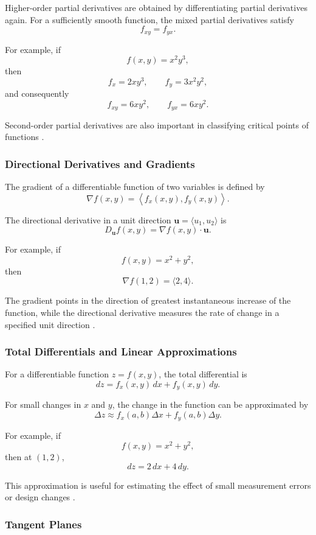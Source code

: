 \documentclass[a4paper,12pt]{article}
\theoremstyle{mystyle}
\numberwithin{equation}{section}
\numberwithin{theorem}{section}
\numberwithin{proposition}{section}
\numberwithin{example}{section}
\numberwithin{remark}{section}
\numberwithin{lemma}{section}
\numberwithin{corollary}{section}
\numberwithin{definition}{section}
\begin{document}
Higher-order partial derivatives are obtained by
differentiating partial derivatives again. For a
sufficiently smooth function, the mixed partial
derivatives satisfy
\[
f_{xy}=f_{yx}.
\]

For example, if
\[
f(x,y)=x^2y^3,
\]
then
\[
f_x=2xy^3,\qquad f_y=3x^2y^2,
\]
and consequently
\[
f_{xy}=6xy^2,\qquad f_{yx}=6xy^2.
\]

Second-order partial derivatives are also important
in classifying critical points of functions
\cite{openstaxmaxima,openstaxpartials}.

\subsubsection{Directional Derivatives and Gradients}

The gradient of a differentiable function of two
variables is defined by
\[
\nabla f(x,y)=
\left\langle f_x(x,y),f_y(x,y)\right\rangle.
\]

The directional derivative in a unit direction
$\mathbf{u}=\langle u_1,u_2\rangle$ is
\[
D_{\mathbf{u}}f(x,y)=\nabla f(x,y)\cdot\mathbf{u}.
\]

For example, if
\[
f(x,y)=x^2+y^2,
\]
then
\[
\nabla f(1,2)=\langle 2,4\rangle.
\]

The gradient points in the direction of greatest
instantaneous increase of the function, while the
directional derivative measures the rate of change
in a specified unit direction \cite{openstaxgradient}.

\subsubsection{Total Differentials and Linear Approximations}

For a differentiable function $z=f(x,y)$, the total
differential is
\[
dz=f_x(x,y)\,dx+f_y(x,y)\,dy.
\]

For small changes in $x$ and $y$, the change in the
function can be approximated by
\[
\Delta z\approx f_x(a,b)\Delta x+
f_y(a,b)\Delta y.
\]

For example, if
\[
f(x,y)=x^2+y^2,
\]
then at $(1,2)$,
\[
dz=2\,dx+4\,dy.
\]

This approximation is useful for estimating the
effect of small measurement errors or design changes
\cite{openstax2022}.

\subsubsection{Tangent Planes}
\end{document}
